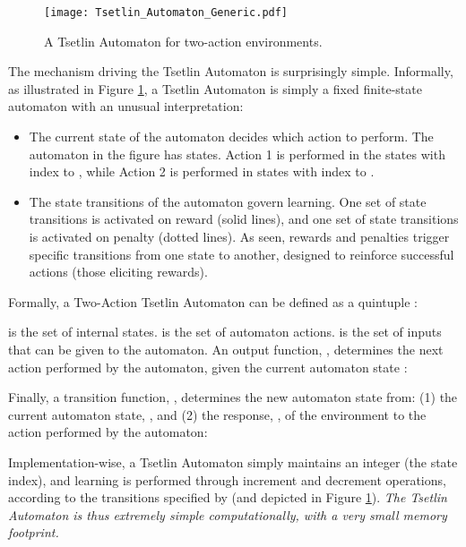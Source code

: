 \documentclass[11pt,a4paper]{article}
\begin{document}
\begin{figure}[!ht]
\centering
\texttt{[image: Tsetlin\_Automaton\_Generic.pdf]}
\caption{A Tsetlin Automaton for two-action environments.}
\label{figure:tsetlin_automaton}
\end{figure}
The mechanism driving the Tsetlin Automaton is surprisingly simple. Informally, as illustrated in Figure \ref{figure:tsetlin_automaton}, a Tsetlin Automaton is simply a fixed finite-state automaton \cite{Carroll1989} with an unusual interpretation:
\begin{itemize}
\item The current state of the automaton decides which action to perform. The automaton in the figure has  states. Action 1 is performed in the states with index  to , while Action 2 is performed in states with index  to .
\item The state transitions of the automaton govern learning. One set of state transitions is activated on reward (solid lines), and one set of state transitions is activated on penalty (dotted lines). As seen, rewards and penalties trigger specific transitions from one state to another, designed to reinforce successful actions (those eliciting rewards). 
\end{itemize}
Formally, a Two-Action Tsetlin Automaton can be defined as a quintuple \cite{Narendra1989}:

 is the set of internal states.  is the set of automaton actions.  is the set of inputs that can be given to the automaton.
An output function, , determines the next action performed by the automaton, 
given the current automaton state : 

Finally, a transition function, , determines the new automaton state from: (1) the current automaton state, ,  and (2) the response, , of the environment to the action performed by the automaton: 


Implementation-wise, a Tsetlin Automaton simply maintains an integer (the state index), and learning is performed through increment and decrement operations, according to the transitions specified by  (and depicted in Figure \ref{figure:tsetlin_automaton}). \emph{The Tsetlin Automaton is thus extremely simple computationally, with a very small memory footprint.}
\end{document}
